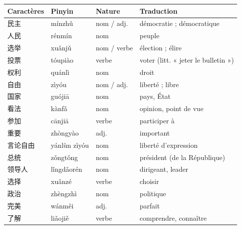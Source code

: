 \documentclass[11pt]{article}
\begin{document}
\begin{center}
\begin{tabularx}{\linewidth}{|X|X|X|X|}
\hline
\rowcolor{popblueL} Caractères & Pinyin & Nature & Traduction \\
\hline
民主 & mínzhǔ & nom / adj. & démocratie ; démocratique \\
\hline
人民 & rénmín & nom & peuple \\
\hline
选举 & xuǎnjǔ & nom / verbe & élection ; élire \\
\hline
投票 & tóupiào & verbe & voter (litt. « jeter le bulletin ») \\
\hline
权利 & quánlì & nom & droit \\
\hline
自由 & zìyóu & nom / adj. & liberté ; libre \\
\hline
国家 & guójiā & nom & pays, État \\
\hline
看法 & kànfǎ & nom & opinion, point de vue \\
\hline
参加 & cānjiā & verbe & participer à \\
\hline
重要 & zhòngyào & adj. & important \\
\hline
言论自由 & yánlùn zìyóu & nom & liberté d'expression \\
\hline
总统 & zǒngtǒng & nom & président (de la République) \\
\hline
领导人 & lǐngdǎorén & nom & dirigeant, leader \\
\hline
选择 & xuǎnzé & verbe & choisir \\
\hline
政治 & zhèngzhì & nom & politique \\
\hline
完美 & wánměi & adj. & parfait \\
\hline
了解 & liǎojiě & verbe & comprendre, connaître \\
\hline
\end{tabularx}
\end{center}
\end{document}
